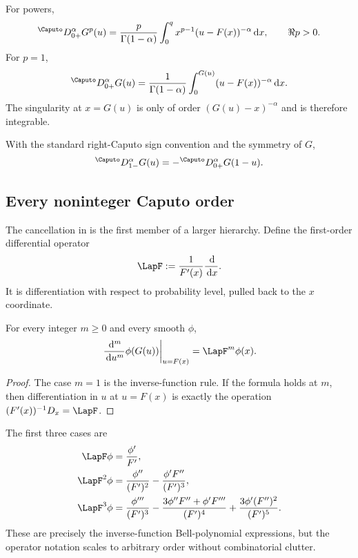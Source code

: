 \documentclass[11pt,oneside]{article}
\theoremstyle{definition}
\theoremstyle{remark}
\newcommand{\dd}{\,\mathrm d}
\newcommand{\1}{\mathbf 1}
\begin{document}
For powers,
\begin{equation}
 {}^{\Caputo}D_{0+}^{\alpha}G^p(u)
 =\frac{p}{\Gamma(1-\alpha)}
  \int_0^{q}x^{p-1}(u-F(x))^{-\alpha}\dd x,
 \qquad \Re p>0.
 \label{p11:eq:caputo-powers}
\end{equation}
For $p=1$,
\begin{equation}
 {}^{\Caputo}D_{0+}^{\alpha}G(u)
 =\frac1{\Gamma(1-\alpha)}
  \int_0^{G(u)}(u-F(x))^{-\alpha}\dd x.
 \label{p11:eq:caputo-G}
\end{equation}
The singularity at $x=G(u)$ is only of order $(G(u)-x)^{-\alpha}$ and is
therefore integrable.

With the standard right-Caputo sign convention and the symmetry of $G$,
\begin{equation}
 {}^{\Caputo}D_{1-}^{\alpha}G(u)
 =-{}^{\Caputo}D_{0+}^{\alpha}G(1-u).
 \label{p11:eq:right-left-caputo-symmetry}
\end{equation}

\subsection{Every noninteger Caputo order}

The cancellation in  is the first member of a
larger hierarchy.  Define the first-order differential operator
\begin{equation}
 \LapF:=\frac1{F'(x)}\frac{\dd}{\dd x}.
 \label{p11:eq:L-F-def}
\end{equation}
It is differentiation with respect to probability level, pulled back to the
$x$ coordinate.

\begin{lemma}
For every integer $m\ge0$ and every smooth $\phi$,
\begin{equation}
 \left.\frac{\dd^m}{\dd u^m}\phi(G(u))\right|_{u=F(x)}
 =\LapF^m\phi(x).
 \label{p11:eq:L-F-chain}
\end{equation}
\end{lemma}

\begin{proof}
The case $m=1$ is the inverse-function rule.  If the formula holds at $m$,
then differentiation in $u$ at $u=F(x)$ is exactly the operation
$(F'(x))^{-1}D_x=\LapF$.
\end{proof}

The first three cases are
\begin{align}
 \LapF\phi
 &=\frac{\phi'}{F'},\\
 \LapF^2\phi
 &=\frac{\phi''}{(F')^2}-\frac{\phi'F''}{(F')^3},\\
 \LapF^3\phi
 &=\frac{\phi'''}{(F')^3}
 -\frac{3\phi''F''+\phi'F'''}{(F')^4}
 +\frac{3\phi'(F'')^2}{(F')^5}.
 \label{p11:eq:first-LF-powers}
\end{align}
These are precisely the inverse-function Bell-polynomial expressions, but the
operator notation scales to arbitrary order without combinatorial clutter.
\end{document}
